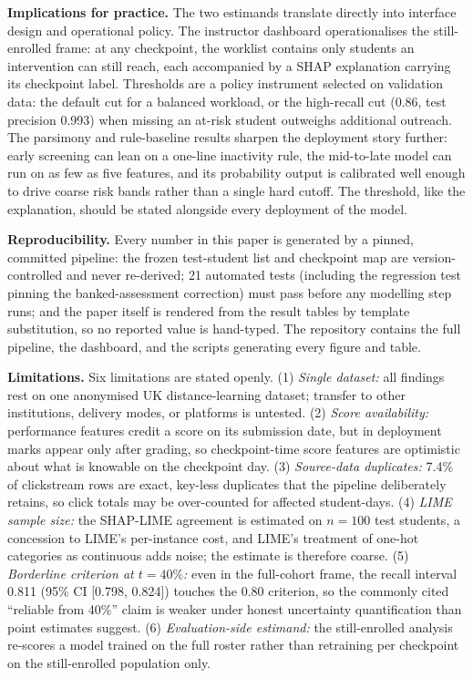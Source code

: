 \documentclass[conference]{IEEEtran}
\begin{document}
\textbf{Implications for practice.}
The two estimands translate directly into interface design and operational
policy. The instructor dashboard operationalises the still-enrolled frame:
at any checkpoint, the worklist contains only students an intervention can
still reach, each accompanied by a SHAP explanation carrying its checkpoint
label. Thresholds are a policy instrument selected on validation data: the
default cut for a balanced workload, or the high-recall cut
(0.86, test precision 0.993) when
missing an at-risk student outweighs additional outreach. The parsimony and
rule-baseline results sharpen the deployment story further: early screening
can lean on a one-line inactivity rule, the mid-to-late model can run on as
few as five features, and its probability output is calibrated well enough
to drive coarse risk bands rather than a single hard cutoff. The threshold,
like the explanation, should be stated alongside every deployment of the
model.

\textbf{Reproducibility.}
Every number in this paper is generated by a pinned, committed pipeline:
the frozen test-student list and checkpoint map are version-controlled and
never re-derived; 21 automated tests (including the regression test pinning
the banked-assessment correction) must pass before any modelling step runs;
and the paper itself is rendered from the result tables by template
substitution, so no reported value is hand-typed. The repository contains
the full pipeline, the dashboard, and the scripts generating every figure
and table.

\textbf{Limitations.}
Six limitations are stated openly. (1) \emph{Single dataset:} all findings
rest on one anonymised UK distance-learning dataset; transfer to other
institutions, delivery modes, or platforms is untested. (2) \emph{Score
availability:} performance features credit a score on its submission date,
but in deployment marks appear only after grading, so checkpoint-time score
features are optimistic about what is knowable on the checkpoint day. (3)
\emph{Source-data duplicates:} 7.4\% of clickstream rows are exact,
key-less duplicates that the pipeline deliberately retains, so click totals
may be over-counted for affected student-days. (4) \emph{LIME sample size:}
the SHAP-LIME agreement is estimated on $n=100$ test students, a concession
to LIME's per-instance cost, and LIME's treatment of one-hot categories as
continuous adds noise; the estimate is therefore coarse. (5)
\emph{Borderline criterion at $t=40\%$:} even in the full-cohort frame, the
recall interval 0.811 (95\% CI [0.798, 0.824]) touches the 0.80 criterion,
so the commonly cited ``reliable from 40\%'' claim is weaker under honest
uncertainty quantification than point estimates suggest. (6)
\emph{Evaluation-side estimand:} the still-enrolled analysis re-scores a
model trained on the full roster rather than retraining per checkpoint on
the still-enrolled population only.
\end{document}
